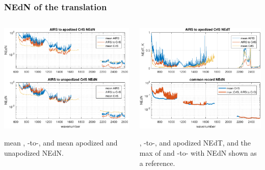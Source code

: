 \documentclass[10pt]{beamer}
\begin{document}
\begin{frame}
\frametitle{NEdN of the translation}
\begin{columns}[t]
\begin{column}{0.5\textwidth}  
  \begin{centering}
  \includegraphics[width=\textwidth]{figures/a2cris_nedn.pdf}
  \end{centering}\vspace{3mm}
  mean {\airs}, {\airs}-to-{\cris}, and mean {\cris} apodized and
  unapodized NEdN.

\end{column}
\begin{column}{0.5\textwidth}
  \begin{centering}
  \includegraphics[width=\textwidth]{figures/a2cris_nedt.pdf}
  \end{centering}\vspace{3mm}
  {\airs}, {\airs}-to-{\cris}, and {\cris} apodized NEdT,
    and the max of {\cris} and {\airs}-to-{\cris} with {\cris}
    NEdN shown as a reference.
 
\end{column}
\end{columns}
\end{frame}
\end{document}
